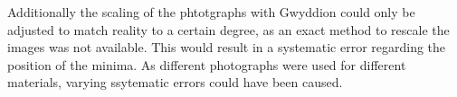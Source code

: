 Additionally the scaling of the phtotgraphs with Gwyddion could only be adjusted to match reality to a certain degree, as an exact method to rescale the images was not available. This would result in a systematic error regarding the position of the minima. As different photographs were used for different materials, varying ssytematic errors could have been caused.

